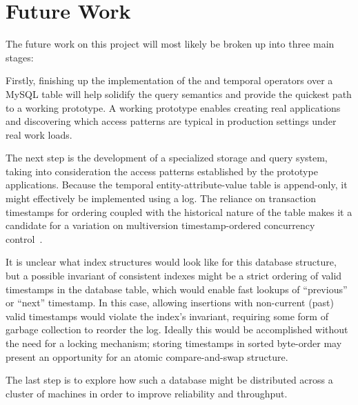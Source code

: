 \section{Future Work} \label{section:futurework}

The future work on this project will most likely be broken up into three main stages:

Firstly, finishing up the implementation of the  and  temporal operators
over a MySQL table will help solidify the query semantics and provide the quickest path to a working prototype.
A working prototype enables creating real applications and discovering which access patterns are typical
in production settings under real work loads.

The next step is the development of a specialized storage and query system,
taking into consideration the access patterns established by the prototype
applications. Because the temporal entity-attribute-value table is append-only,
it might effectively be implemented using a log. The reliance on transaction timestamps
for ordering coupled with the historical nature of the table makes it a candidate for a variation on multiversion
timestamp-ordered concurrency control~\cite{bernstein1981concurrency}.

It is unclear what index structures would look like for this database
structure, but a possible invariant of consistent indexes might be a strict
ordering of valid timestamps in the database table, which would enable fast
lookups of ``previous'' or ``next'' timestamp. In this case, allowing
insertions with non-current (past) valid timestamps would violate the index's
invariant, requiring some form of garbage collection to reorder the log.
Ideally this would be accomplished without the need for a locking mechanism;
storing timestamps in sorted byte-order may present an opportunity for an
atomic compare-and-swap structure.

The last step is to explore how such a database might be distributed across a
cluster of machines in order to improve reliability and throughput.
